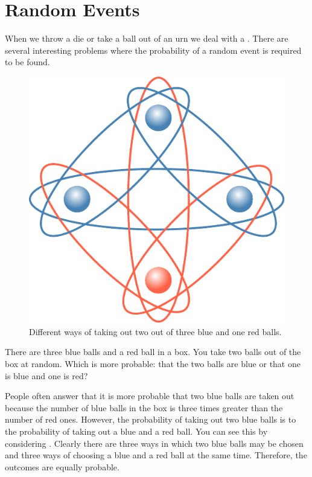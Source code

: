 \section{Random Events}

When we throw a die or take a ball out of an urn we deal with
a . There are several interesting problems where the
probability of a random event is required to be found.

\begin{figure}
 \centering
 \includegraphics[width=\linewidth]{figures/three-balls.pdf}
\caption{Different ways of taking out two out of three blue and one
  red balls.\label{three-balls}}
\end{figure}


 There are three blue balls and a red
ball in a box. You take two balls out of the box at random. Which is
more probable: that the two balls are blue or that one is blue and one is
red?

People often answer that it is more probable that two blue balls are
taken out because the number of blue balls in the box is three times
greater than the number of red ones. However, the probability of taking
out two blue balls is  to the probability of taking out a blue and
a red ball. You can see this by considering . Clearly there are three ways in which two blue balls may be chosen and three ways of
choosing a blue and a red ball at the same time. Therefore, the
outcomes are equally probable.


